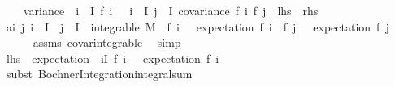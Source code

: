 \begin{isabellebody}
\ \ \ \ {\isachardoublequoteopen}variance\ {\isacharparenleft}{\kern0pt}{\isasymlambda}{\isasymomega}{\isachardot}{\kern0pt}\ {\isacharparenleft}{\kern0pt}{\isasymSum}i\ {\isasymin}\ I{\isachardot}{\kern0pt}\ f\ i\ {\isasymomega}{\isacharparenright}{\kern0pt}{\isacharparenright}{\kern0pt}\ {\isacharequal}{\kern0pt}\ {\isacharparenleft}{\kern0pt}{\isasymSum}i\ {\isasymin}\ I{\isachardot}{\kern0pt}\ {\isacharparenleft}{\kern0pt}{\isasymSum}j\ {\isasymin}\ I{\isachardot}{\kern0pt}\ covariance\ {\isacharparenleft}{\kern0pt}f\ i{\isacharparenright}{\kern0pt}\ {\isacharparenleft}{\kern0pt}f\ j{\isacharparenright}{\kern0pt}{\isacharparenright}{\kern0pt}{\isacharparenright}{\kern0pt}{\isachardoublequoteclose}\ {\isacharparenleft}{\kern0pt}\ {\isachardoublequoteopen}{\isacharquery}{\kern0pt}lhs\ {\isacharequal}{\kern0pt}\ {\isacharquery}{\kern0pt}rhs{\isachardoublequoteclose}{\isacharparenright}{\kern0pt}\isanewline
%
\isadelimproof
%
\endisadelimproof
%
\isatagproof
{}\isamarkupfalse%
\ {\isacharminus}{\kern0pt}\isanewline
\ \ \isamarkupfalse%
\ a{\isacharcolon}{\kern0pt}{\isachardoublequoteopen}{\isasymAnd}i\ j{\isachardot}{\kern0pt}\ i\ {\isasymin}\ I\ {\isasymLongrightarrow}\ j\ {\isasymin}\ I\ {\isasymLongrightarrow}\ integrable\ M\ {\isacharparenleft}{\kern0pt}{\isasymlambda}{\isasymomega}{\isachardot}{\kern0pt}\ {\isacharparenleft}{\kern0pt}f\ i\ {\isasymomega}\ {\isacharminus}{\kern0pt}\ expectation\ {\isacharparenleft}{\kern0pt}f\ i{\isacharparenright}{\kern0pt}{\isacharparenright}{\kern0pt}\ {\isacharasterisk}{\kern0pt}\ {\isacharparenleft}{\kern0pt}f\ j\ {\isasymomega}\ {\isacharminus}{\kern0pt}\ expectation\ {\isacharparenleft}{\kern0pt}f\ j{\isacharparenright}{\kern0pt}{\isacharparenright}{\kern0pt}{\isacharparenright}{\kern0pt}{\isachardoublequoteclose}\ \isanewline
\ \ \ \ \isamarkupfalse%
\ assms\ covar{\isacharunderscore}{\kern0pt}integrable\ \isamarkupfalse%
\ simp\isanewline
\ \ \isamarkupfalse%
\ {\isachardoublequoteopen}{\isacharquery}{\kern0pt}lhs\ {\isacharequal}{\kern0pt}\ expectation\ {\isacharparenleft}{\kern0pt}{\isasymlambda}{\isasymomega}{\isachardot}{\kern0pt}\ {\isacharparenleft}{\kern0pt}{\isasymSum}i{\isasymin}I{\isachardot}{\kern0pt}\ f\ i\ {\isasymomega}\ {\isacharminus}{\kern0pt}\ expectation\ {\isacharparenleft}{\kern0pt}f\ i{\isacharparenright}{\kern0pt}{\isacharparenright}{\kern0pt}\isanewline
\ \ \ \ \isamarkupfalse%
\ {\isacharparenleft}{\kern0pt}subst\ Bochner{\isacharunderscore}{\kern0pt}Integration{\isachardot}{\kern0pt}integral{\isacharunderscore}{\kern0pt}sum{\isacharparenright}{\kern0pt}\isanewline

\end{isabellebody}

